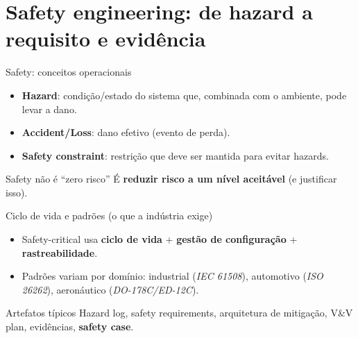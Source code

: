 \documentclass{beamer}
\begin{document}
\section{Safety engineering: de hazard a requisito e evidência}

\begin{frame}{Safety: conceitos operacionais}
\begin{itemize}
  \item \textbf{Hazard}: condição/estado do sistema que, combinada com o ambiente, pode levar a dano.
  \item \textbf{Accident/Loss}: dano efetivo (evento de perda).
  \item \textbf{Safety constraint}: restrição que deve ser mantida para evitar hazards.
\end{itemize}

\begin{block}{Safety não é “zero risco”}
É \textbf{reduzir risco a um nível aceitável} (e justificar isso).
\end{block}

\end{frame}

\begin{frame}{Ciclo de vida e padrões (o que a indústria exige)}
\begin{itemize}
  \item Safety-critical usa \textbf{ciclo de vida} + \textbf{gestão de configuração} + \textbf{rastreabilidade}.
  \item Padrões variam por domínio: industrial (\textit{IEC 61508}), automotivo (\textit{ISO 26262}), aeronáutico (\textit{DO-178C/ED-12C}).
\end{itemize}

\begin{block}{Artefatos típicos}
Hazard log, safety requirements, arquitetura de mitigação, V\&V plan, evidências, \textbf{safety case}.
\end{block}

\end{frame}
\end{document}
